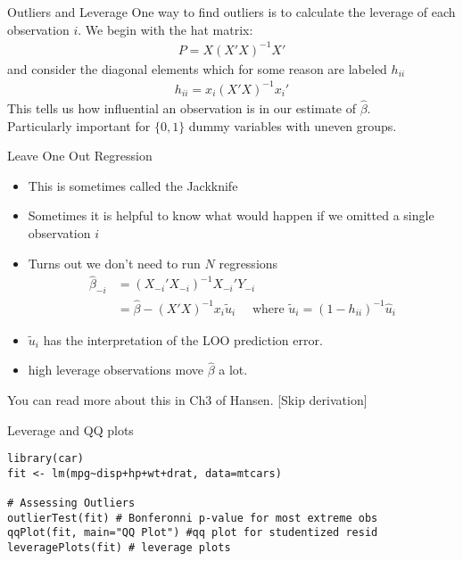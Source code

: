 \documentclass[aspectratio=169]{beamer}
\begin{document}
\begin{frame}{Outliers and Leverage}
One way to find \alert{outliers} is to calculate the \alert{leverage} of each observation $i$. We begin with the \alert{hat matrix}:
\begin{align*}
P = X  (X'X)^{-1} X'
\end{align*}
and consider the diagonal elements which for some reason are labeled $h_{ii}$
\begin{align*}
h_{ii} = x_i (X'X)^{-1} x_i'
\end{align*}
This tells us how \alert{influential} an observation is in our estimate of $\widehat{\beta}$.\\
Particularly important for $\{0,1\}$ \alert{dummy variables} with uneven groups.
\end{frame}


\begin{frame}{Leave One Out Regression}
\begin{itemize}
\item This is sometimes called the \alert{Jackknife}
\item Sometimes it is helpful to know what would happen if we omitted a single observation $i$
\item Turns out we don't need to run $N$ regressions
\begin{align*}
\widehat{\beta}_{-i} &= (X_{-i}'X_{-i})^{-1} X_{-i}' Y_{-i} \\
&=\widehat{\beta} -  (X 'X)^{-1} x_i  \tilde{u}_i  \quad \mbox{ where } \tilde{u}_i = (1-h_{ii})^{-1}\hat{u}_i
\end{align*}
\item $\tilde{u}_i $ has the interpretation of the \alert{LOO prediction error}.
\item high leverage observations move $\widehat{\beta}$ a lot.
\end{itemize}
You can read more about this in Ch3 of Hansen. [Skip derivation]
\end{frame}

\begin{frame}[fragile]{Leverage and QQ plots}
\begin{verbatim}
library(car)
fit <- lm(mpg~disp+hp+wt+drat, data=mtcars)

# Assessing Outliers
outlierTest(fit) # Bonferonni p-value for most extreme obs
qqPlot(fit, main="QQ Plot") #qq plot for studentized resid 
leveragePlots(fit) # leverage plots
\end{verbatim}
\end{frame}
\end{document}
